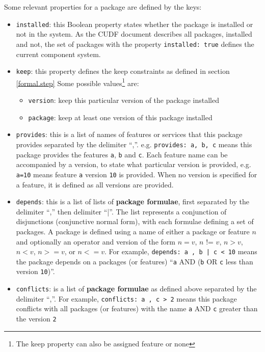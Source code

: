 Some relevant properties for a package are defined by the keys:
\begin{itemize}
  \item \verb+installed+: this Boolean property states whether the package is installed or not in the system. 
  As the CUDF document describes all packages, installed and not, the set of packages with the property \verb+installed: true+ defines the current component system.
  \item \verb+keep+: this property defines the keep constraints as defined in section \ref{formal.step}
  Some possible values\footnote{The keep property can also be assigned feature or none} are:
	  	\begin{itemize}
	  		\item \verb+version+: keep this particular version of the package installed
	  		\item \verb+package+: keep at least one version of this package installed
		\end{itemize}
  \item \verb+provides+: this is a list of names of features or services that this package provides separated by the delimiter ``,''.
  e.g. \verb+provides: a, b, c+ means this package provides the features \verb+a+, \verb+b+ and \verb+c+.
  Each feature name can be accompanied by a version, to state what particular version is provided, e.g. \verb+a=10+ means feature \verb+a+ version \verb+10+ is provided.
  When no version is specified for a feature, it is defined as all versions are provided.
  \item \verb+depends+: this is a list of lists of \textbf{package formulae}, first separated by the delimiter ``,'' then delimiter ``|''.
  The list represents a conjunction of disjunctions (conjunctive normal form), with each formulae defining a set of packages.
  A package is defined using a name of either a package or feature $n$ and optionally an operator and version of the form  $n = v$, $n$ != $v$, $n > v$, $n < v$, $n >= v$, or $n <= v$.
  For example, \verb+depends: a , b | c < 10+ means the package depends on a packages (or features) ``\verb+a+ AND (\verb+b+ OR \verb+c+ less than version \verb+10+)''.  
  \item \verb+conflicts+: is a list of \textbf{package formulae} as defined above separated by the delimiter ``,''.
  For example, \verb+conflicts: a , c > 2+ means this package conflicts with all packages (or features) with the name \verb+a+ AND \verb+c+ greater than the version \verb+2+
\end{itemize}

